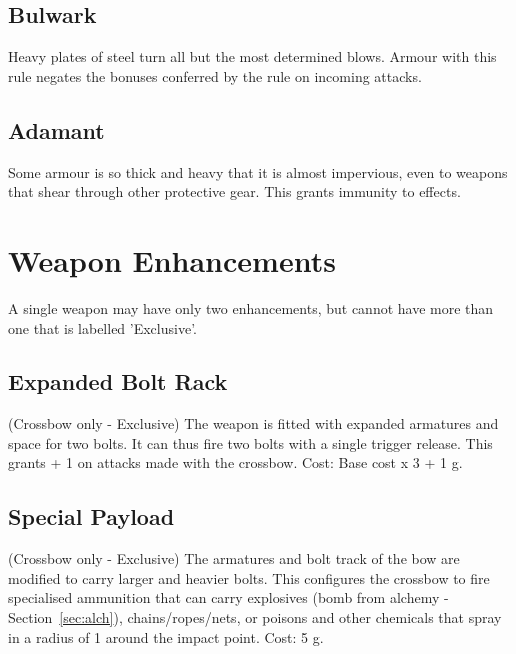 \subsection{Bulwark}
Heavy plates of steel turn all but the most determined blows. Armour with this rule negates the bonuses conferred by the  rule on incoming attacks.

\subsection{Adamant}
Some armour is so thick and heavy that it is almost impervious, even to weapons that shear through other protective gear. This grants immunity to  effects.



\section{Weapon Enhancements}
A single weapon may have only two enhancements, but cannot have more than one that is labelled 'Exclusive'.


\subsection{Expanded Bolt Rack}
(Crossbow only - Exclusive) The weapon is fitted with expanded armatures and space for two bolts. It can thus fire two bolts with a single trigger release. This grants  + 1 on attacks made with the crossbow. Cost: Base cost x 3 + 1 g. 

\subsection{Special Payload}
(Crossbow only - Exclusive) The armatures and bolt track of the bow are modified to carry larger and heavier bolts. This configures the crossbow to fire specialised ammunition that can carry explosives (bomb from alchemy - Section~\ref{sec:alch}), chains/ropes/nets, or poisons and other chemicals that spray in a radius of 1 around the impact point. Cost: 5 g.

